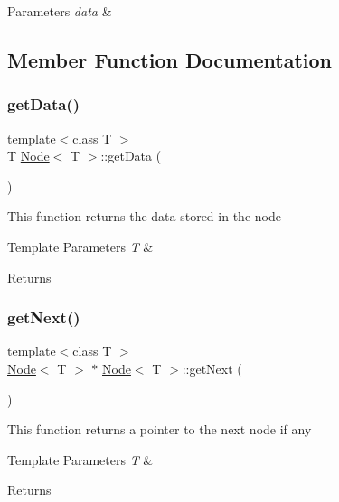 \begin{DoxyParams}{Parameters}
{\em data} & \\
\hline
\end{DoxyParams}


\subsection{Member Function Documentation}
\mbox{\label{class_node_a0c3315ee2e897e2a6e1c24aeca20aeb9}} 
\subsubsection{\texorpdfstring{getData()}{getData()}}
{\footnotesize\ttfamily template$<$class T $>$ \\
T \mbox{\hyperlink{class_node}{Node}}$<$ T $>$\+::get\+Data (\begin{DoxyParamCaption}{ }\end{DoxyParamCaption})}

This function returns the data stored in the node 
\begin{DoxyTemplParams}{Template Parameters}
{\em T} & \\
\hline
\end{DoxyTemplParams}
\begin{DoxyReturn}{Returns}

\end{DoxyReturn}
\mbox{\label{class_node_a688501032615bbd05c9f42ef89d63db5}} 
\subsubsection{\texorpdfstring{getNext()}{getNext()}}
{\footnotesize\ttfamily template$<$class T $>$ \\
\mbox{\hyperlink{class_node}{Node}}$<$ T $>$ $\ast$ \mbox{\hyperlink{class_node}{Node}}$<$ T $>$\+::get\+Next (\begin{DoxyParamCaption}{ }\end{DoxyParamCaption})}

This function returns a pointer to the next node if any 
\begin{DoxyTemplParams}{Template Parameters}
{\em T} & \\
\hline
\end{DoxyTemplParams}
\begin{DoxyReturn}{Returns}

\end{DoxyReturn}
\mbox{\label{class_node_a44c4e1cb20b85f0cf5d463a802b3a0cd}} 

